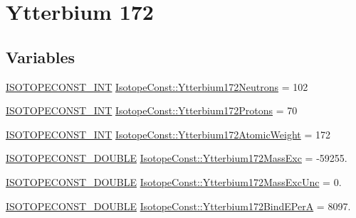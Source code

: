\hypertarget{group___isotope_const-_ytterbium-_yb172}{}\section{Ytterbium 172}
\label{group___isotope_const-_ytterbium-_yb172}
\subsection*{Variables}
\begin{DoxyCompactItemize}
\item 
\mbox{\hyperlink{group___isotope_const-_macros_ga5f18360b3e99483a35c32d789e62621c}{I\+S\+O\+T\+O\+P\+E\+C\+O\+N\+S\+T\+\_\+\+I\+NT}} \mbox{\hyperlink{group___isotope_const-_ytterbium-_yb172_ga3f256895c8d15996708e2ad72d1a1223}{Isotope\+Const\+::\+Ytterbium172\+Neutrons}} = 102
\item 
\mbox{\hyperlink{group___isotope_const-_macros_ga5f18360b3e99483a35c32d789e62621c}{I\+S\+O\+T\+O\+P\+E\+C\+O\+N\+S\+T\+\_\+\+I\+NT}} \mbox{\hyperlink{group___isotope_const-_ytterbium-_yb172_ga0fc1c300f0d9677ab2b4d7c1a2bee3bc}{Isotope\+Const\+::\+Ytterbium172\+Protons}} = 70
\item 
\mbox{\hyperlink{group___isotope_const-_macros_ga5f18360b3e99483a35c32d789e62621c}{I\+S\+O\+T\+O\+P\+E\+C\+O\+N\+S\+T\+\_\+\+I\+NT}} \mbox{\hyperlink{group___isotope_const-_ytterbium-_yb172_ga973e03ef26965dad56237fe7deeeaede}{Isotope\+Const\+::\+Ytterbium172\+Atomic\+Weight}} = 172
\item 
\mbox{\hyperlink{group___isotope_const-_macros_ga8f45a7272ce02c0b4c65c44636ed719a}{I\+S\+O\+T\+O\+P\+E\+C\+O\+N\+S\+T\+\_\+\+D\+O\+U\+B\+LE}} \mbox{\hyperlink{group___isotope_const-_ytterbium-_yb172_ga302fd5cc975241f64ac0739c1ceb159e}{Isotope\+Const\+::\+Ytterbium172\+Mass\+Exc}} = -\/59255.
\item 
\mbox{\hyperlink{group___isotope_const-_macros_ga8f45a7272ce02c0b4c65c44636ed719a}{I\+S\+O\+T\+O\+P\+E\+C\+O\+N\+S\+T\+\_\+\+D\+O\+U\+B\+LE}} \mbox{\hyperlink{group___isotope_const-_ytterbium-_yb172_gaa05d8fedf942a713904a49c8ae9bebde}{Isotope\+Const\+::\+Ytterbium172\+Mass\+Exc\+Unc}} = 0.
\item 
\mbox{\hyperlink{group___isotope_const-_macros_ga8f45a7272ce02c0b4c65c44636ed719a}{I\+S\+O\+T\+O\+P\+E\+C\+O\+N\+S\+T\+\_\+\+D\+O\+U\+B\+LE}} \mbox{\hyperlink{group___isotope_const-_ytterbium-_yb172_ga77b8e61d7d7f13ca9fffdbf8fa663f31}{Isotope\+Const\+::\+Ytterbium172\+Bind\+E\+PerA}} = 8097.
\item 

\end{DoxyCompactItemize}
